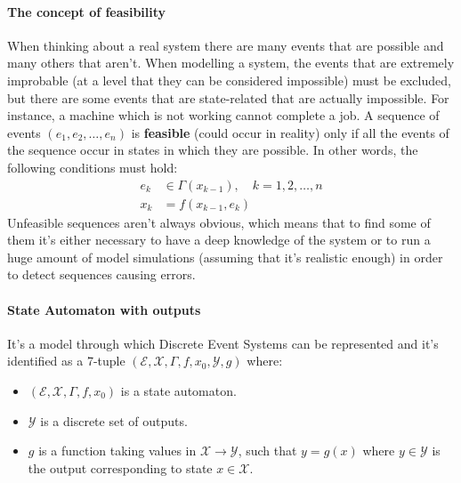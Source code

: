 \documentclass[12pt,a4paper]{article}
\begin{document}
\paragraph{The concept of feasibility} When thinking about a real system there are many events that are possible and many others that aren’t. When modelling a system, the events that are extremely improbable (at a level that they can be considered impossible) must be excluded, but there are some events that are state-related that are actually impossible. For instance, a machine which is not working cannot complete a job. A sequence of events $(e_1,e_2,\dots,e_n)$ is \textbf{feasible} (could occur in reality) only if all the events of the sequence occur in states in which they are possible. In other words, the following conditions must hold:
\begin{align*}
e_k &\in \Gamma (x_{k-1}), \quad k = 1,2,\dots,n \\ 
x_k &= f(x_{k-1},e_k)
\end{align*}
Unfeasible sequences aren’t always obvious, which means that to find some of them it’s either necessary to have a deep knowledge of the system or to run a huge amount of model simulations (assuming that it’s realistic enough) in order to detect sequences causing errors.

\paragraph{State Automaton with outputs} It’s a model through which Discrete Event Systems can be represented and it’s identified as a 7-tuple $(\mathcal{E},\mathcal{X},\Gamma,f,x_0,\mathcal{Y},g)$ where:
\begin{itemize}
\item $(\mathcal{E},\mathcal{X},\Gamma,f,x_0)$ is a state automaton.
\item $\mathcal{Y}$ is a discrete set of outputs.
\item $g$ is a function taking values in $\mathcal{X}\rightarrow\mathcal{Y}$, such that $y=g(x)$ where $y\in\mathcal{Y}$ is the output corresponding to state $x\in\mathcal{X}$.
\end{itemize}
\end{document}
